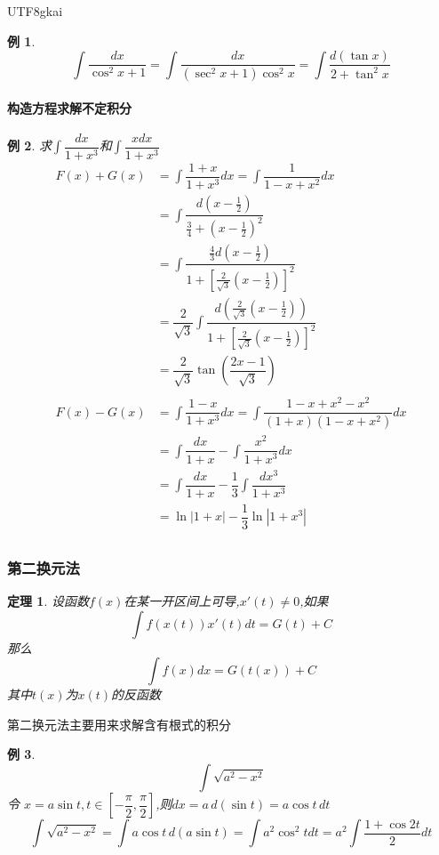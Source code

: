 \documentclass{article}
\newtheorem{theorem}{定理}[subsection]
\newtheorem{example}{例}[subsection]
\begin{document}
\begin{CJK}{UTF8}{gkai}
\begin{example}
  \[\int \dfrac{dx}{\cos^2 x+ 1} = \int \dfrac{dx}{(\sec^2 x+ 1)\cos^2 x} = \int \dfrac{d(\tan x)}{2 + \tan^2 x}\]
\end{example}

\paragraph{构造方程求解不定积分}

\begin{example}
  求$\int \dfrac{dx}{1 + x^3}$和$\int \dfrac{xdx}{1 + x^3}$\\
  \[
  \begin{aligned}  
  F(x) + G(x) &= \int \dfrac{1 + x}{1 + x^3}dx = \int \dfrac{1}{1-x + x^2}dx\\
  &=\int \dfrac{d(x-\frac{1}{2})}{\frac{3}{4}+(x-\frac{1}{2})^2}\\
  &=\int \dfrac{\frac{4}{3}d(x-\frac{1}{2})}{1+[\frac{2}{\sqrt{3}}(x-\frac{1}{2})]^2}\\
  &=\dfrac{2}{\sqrt{3}}\int \dfrac{d(\frac{2}{\sqrt{3}}(x-\frac{1}{2}))}{1+[\frac{2}{\sqrt{3}}(x-\frac{1}{2})]^2}\\
  &=\dfrac{2}{\sqrt{3}}\tan\left(\dfrac{2x - 1}{\sqrt{3}}\right)\\
  &\\
F(x) - G(x) &= \int \dfrac{1 - x}{1 + x^3}dx = \int \dfrac{1-x + x^2 - x^2}{(1+ x )(1 -x + x^2)}dx \\
&= \int \dfrac{dx}{1+x} - \int \dfrac{x^2}{1+x^3} dx  \\
&= \int \dfrac{dx}{1+x} - \dfrac{1}{3}\int \dfrac{dx^3}{1+x^3} \\
&=\ln|1 + x| - \dfrac{1}{3}\ln|1 + x^3|\\
  \end{aligned}
\]
\end{example}
\subsubsection{第二换元法}
\begin{theorem}
设函数$f(x)$在某一开区间上可导,$x'(t) \neq 0$,如果
\[\int f(x(t))x'(t)dt = G(t) + C\]
那么
\[\int f(x)dx = G(t(x)) + C\]
其中$t(x)$为$x(t)$的反函数\\
\end{theorem}

第二换元法主要用来求解含有根式的积分\\
\begin{example}
\[\int \sqrt{a^2 - x^2}\]
令 $x = a\sin t, t\in [-\dfrac{\pi}{2},\dfrac{\pi}{2}]$,则$dx = a \,d(\sin t)= a\cos t \, dt$
\[\int \sqrt{a^2 - x^2} = \int a\cos t \,d( a\sin t) = \int a^2 \cos^2 t dt = a^2 \int \dfrac{1 + \cos 2t}{2} dt\]
\end{example}


\end{CJK}
\end{document}
